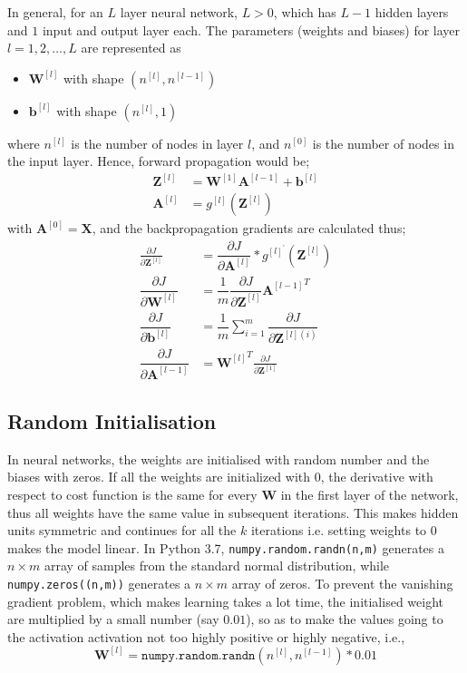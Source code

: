 \documentclass[12pt]{report}
\numberwithin{equation}{section}
\begin{document}
In general, for an $L$ layer neural network, $L > 0$, which has $L-1$ hidden layers and $1$ input and output layer each. The parameters (weights and biases) for layer $l = 1,2,\hdots,L$ are represented as
\begin{multicols}{2}
\begin{itemize}[label=-]
\item $\bm{W}^{[l]}$ with shape $(n^{[l]},n^{[l-1]})$ 
\item $\bm{b}^{[l]}$ with shape $(n^{[l]},1)$
\end{itemize}
\end{multicols}
\noindent
where $n^{[l]}$ is the number of nodes in layer $l$, and $n^{[0]}$ is the number of nodes in the input layer. Hence, forward propagation would be;
\[
\begin{split}
\bm{Z}^{[l]}  &= \bm{W}^{[1]} \bm{A}^{[l-1]} + \bm{b}^{[l]} \\
 \bm{A}^{[l]} &= g^{[l]}(\bm{Z}^{[l]})
\end{split} 
\]
with $\bm{A}^{[0]}=\bm{X}$, and the backpropagation gradients are calculated thus;
\[
\begin{split}
\frac{\partial J}{\partial \bm{Z}^{[l]}} &= \dfrac{\partial J}{\partial \bm{A}^{[l]}} * g^{[l]^{\prime}}(\bm{Z}^{[l]}) \\
\dfrac{\partial J}{\partial \bm{W}^{[l]}} &= \dfrac{1}{m} \dfrac{\partial J}{\partial \bm{Z}^{[l]}} {\bm{A}^{[l-1]}}^T \\
\dfrac{\partial J}{\partial \bm{b}^{[l]}} &= \dfrac{1}{m} \sum\limits_{i=1}^m \dfrac{\partial J}{\partial \bm{Z}^{[l](i)}} \\
\dfrac{\partial J}{\partial \bm{A}^{[l-1]}} &= {\bm{W}^{[l]}}^T \frac{\partial J}{\partial \bm{Z}^{[1]}} 
\end{split}
\]

\subsection{Random Initialisation}
In neural networks, the weights are initialised with random number and the biases with zeros. If all the weights are initialized with $0$, the derivative with respect to cost function is the same for every $\bm{W}$ in the first layer of the network, thus all weights have the same value in subsequent iterations. This makes hidden units symmetric and continues for all the $k$ iterations i.e. setting weights to $0$ makes the model linear. In Python 3.7, \texttt{numpy.random.randn(n,m)} generates a $n\times m$ array of samples from the standard normal distribution, while \texttt{numpy.zeros((n,m))} generates a $n\times m$ array of zeros. To prevent the vanishing gradient problem, which makes learning takes a lot time, the initialised weight are multiplied by a small number (say $0.01$), so as to make the values going to the activation activation not too highly positive or highly negative, i.e.,
\[
\bm{W}^{[l]} = \texttt{numpy.random.randn}(n^{[l]},n^{[l-1]}) * 0.01
\]
\end{document}
